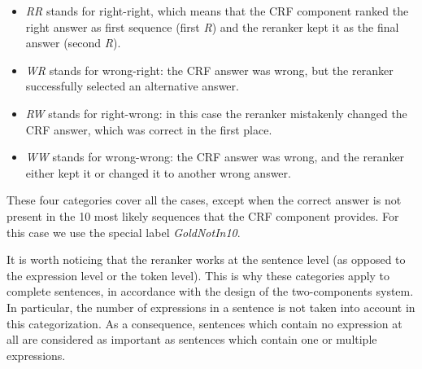 \documentclass[output=paper,modfonts,nonflat]{langsci/langscibook}
\begin{document}
\begin{itemize}
\item {\it RR} stands for right-right, which means that the CRF
  component ranked the right answer as first sequence (first {\it R})
  and the reranker kept it as the final answer (second {\it R}).
\item {\it WR} stands for wrong-right: the CRF answer was wrong, but
  the reranker successfully selected an alternative answer.
\item {\it RW} stands for right-wrong: in this case the reranker
  mistakenly changed the CRF answer, which was correct in the first
  place.
\item {\it WW} stands for wrong-wrong: the CRF answer was wrong, and
  the reranker either kept it or changed it to another wrong answer.
\end{itemize}

These four categories cover all the cases, except when the correct
answer is not present in the 10 most likely sequences that the CRF
component provides. For this case we use the special label {\it
  GoldNotIn10}.

It is worth noticing that the reranker works at the sentence level (as
opposed to the expression level or the token level). This is why these
categories apply to complete sentences, in accordance with the design
of the two-components system. In particular, the number of expressions
in a sentence is not taken into account in this categorization. As a
consequence, sentences which contain no expression at all are
considered as important as sentences which contain one or multiple
expressions.
\end{document}
